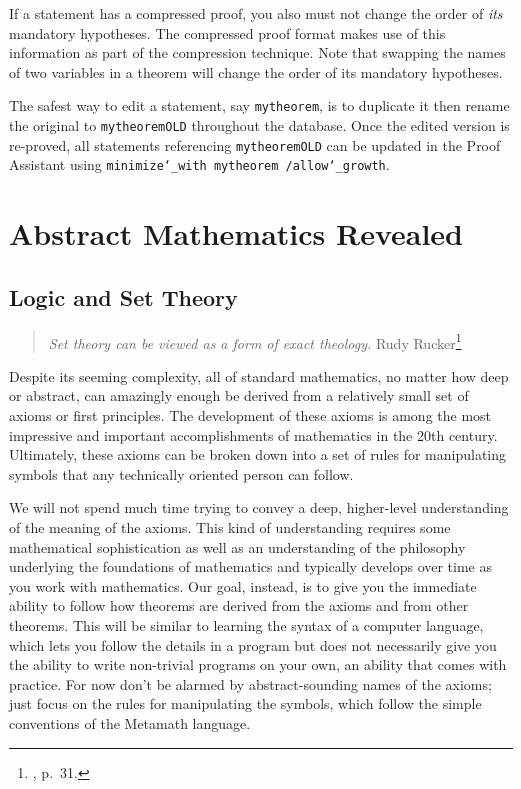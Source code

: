 If a statement has a compressed proof, you also must not change the
order of {\em its} mandatory hypotheses.  The compressed proof format
makes use of this information as part of the compression technique.
Note that swapping the names of two variables in a theorem will change
the order of its mandatory hypotheses.

The safest way to edit a statement, say \texttt{mytheorem}, is to
duplicate it then rename the original to \texttt{mytheoremOLD}
throughout the database.  Once the edited version is re-proved, all
statements referencing \texttt{mytheoremOLD} can be updated in the Proof
Assistant using \texttt{minimize{\char`\_}with
mytheorem
/allow{\char`\_}growth}.

\chapter{Abstract Mathematics Revealed}\label{fol}

\section{Logic and Set Theory}\label{logicandsettheory}

\begin{quote}
  {\em Set theory can be viewed as a form of exact theology.}
  \flushright\sc  Rudy Rucker\footnote{\cite{Barrow}, p.~31.}\\
\end{quote}

Despite its seeming complexity, all of standard mathematics, no matter how
deep or abstract, can amazingly enough be derived from a relatively small set
of axioms or first principles. The development of these axioms is
among the most impressive and important accomplishments of mathematics in the
20th century. Ultimately, these axioms can be broken down into a set of rules
for manipulating symbols that any technically oriented person can follow.

We will not spend much time trying to convey a deep, higher-level
understanding of the meaning of the axioms. This kind of understanding
requires some mathematical sophistication as well as an understanding of the
philosophy underlying the foundations of mathematics and typically develops
over time as you work with mathematics.  Our goal, instead, is to give you the
immediate ability to follow how theorems are derived from the
axioms and from other theorems.  This will be similar to learning the syntax
of a computer language, which lets you follow the details in a program but
does not necessarily give you the ability to write non-trivial programs on
your own, an ability that comes with practice. For now don't be alarmed by
abstract-sounding names of the axioms; just focus on the rules for
manipulating the symbols, which follow the simple conventions of the
Metamath language.

